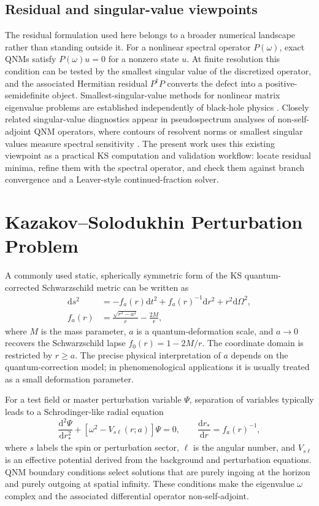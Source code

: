 \documentclass[10pt,letterpaper,twocolumn]{article}
\newcommand{\dd}{\mathrm{d}}
\begin{document}
\subsection{Residual and singular-value viewpoints}

The residual formulation used here belongs to a broader numerical landscape rather than standing outside it. For a nonlinear spectral operator \(P(\omega)\), exact QNMs satisfy \(P(\omega)u=0\) for a nonzero state \(u\). At finite resolution this condition can be tested by the smallest singular value of the discretized operator, and the associated Hermitian residual \(P^\dagger P\) converts the defect into a positive-semidefinite object. Smallest-singular-value methods for nonlinear matrix eigenvalue problems are established independently of black-hole physics \cite{Sadkane2023}. Closely related singular-value diagnostics appear in pseudospectrum analyses of non-self-adjoint QNM operators, where contours of resolvent norms or smallest singular values measure spectral sensitivity \cite{Jaramillo2021,Cao2024}. The present work uses this existing viewpoint as a practical KS computation and validation workflow: locate residual minima, refine them with the spectral operator, and check them against branch convergence and a Leaver-style continued-fraction solver.

\section{Kazakov--Solodukhin Perturbation Problem}

A commonly used static, spherically symmetric form of the KS quantum-corrected Schwarzschild metric can be written as
\begin{equation}
\begin{aligned}
\dd s^2 &=
-f_a(r)\dd t^2 + f_a(r)^{-1}\dd r^2
+ r^2 \dd\Omega^2,\\
f_a(r)&=\frac{\sqrt{r^2-a^2}}{r}-\frac{2M}{r},
\end{aligned}
\label{eq:ksmetric}
\end{equation}
where \(M\) is the mass parameter, \(a\) is a quantum-deformation scale, and \(a\to0\) recovers the Schwarzschild lapse \(f_0(r)=1-2M/r\). The coordinate domain is restricted by \(r\geq a\). The precise physical interpretation of \(a\) depends on the quantum-correction model; in phenomenological applications it is usually treated as a small deformation parameter.

For a test field or master perturbation variable \(\Psi\), separation of variables typically leads to a Schrodinger-like radial equation
\begin{equation}
\frac{\dd^2\Psi}{\dd r_*^2}+
\left[\omega^2 - V_{s\ell}(r;a)\right]\Psi=0,
\qquad
\frac{\dd r_*}{\dd r}=f_a(r)^{-1},
\label{eq:qnmwave}
\end{equation}
where \(s\) labels the spin or perturbation sector, \(\ell\) is the angular number, and \(V_{s\ell}\) is an effective potential derived from the background and perturbation equations. QNM boundary conditions select solutions that are purely ingoing at the horizon and purely outgoing at spatial infinity. These conditions make the eigenvalue \(\omega\) complex and the associated differential operator non-self-adjoint.
\end{document}
